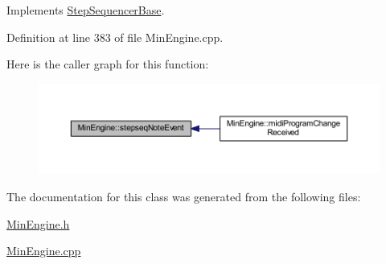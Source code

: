 Implements \hyperlink{class_step_sequencer_base_a9f32f8ae8eb8afb1c2ea39ed8d856657}{Step\+Sequencer\+Base}.



Definition at line 383 of file Min\+Engine.\+cpp.

Here is the caller graph for this function\+:
\nopagebreak
\begin{figure}[H]
\begin{center}
\leavevmode
\includegraphics[width=350pt]{d4/d0f/class_min_engine_a46ab2a887b8c83c9b484304778bc01a1_icgraph}
\end{center}
\end{figure}


The documentation for this class was generated from the following files\+:\begin{DoxyCompactItemize}
\item 
\hyperlink{_min_engine_8h}{Min\+Engine.\+h}\item 
\hyperlink{_min_engine_8cpp}{Min\+Engine.\+cpp}\end{DoxyCompactItemize}
